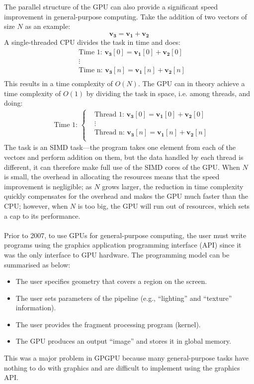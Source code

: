\documentclass[12pt, twocolumn]{report}
\begin{document}
The parallel structure of the GPU can also provide a significant speed improvement in general-purpose computing. Take the addition of two vectors of size $N$ as an example:
\begin{equation*}
    \boldsymbol{v_3} = \boldsymbol{v_1} + \boldsymbol{v_2}
\end{equation*}
A single-threaded CPU divides the task in time and does:
\begin{align*}
    & \text{Time 1: } \boldsymbol{v_3}[0] = \boldsymbol{v_1}[0] + \boldsymbol{v_2}[0] \\
    & \vdots \\
    & \text{Time n: } \boldsymbol{v_3}[n] = \boldsymbol{v_1}[n] + \boldsymbol{v_2}[n] \\
\end{align*}
This results in a time complexity of $O(N)$. The GPU can in theory achieve a time complexity of $O(1)$ by dividing the task in space, i.e. among threads, and doing:
\begin{align*}
    & \text{Time 1: }
\begin{cases}
    & \text{Thread 1: } \boldsymbol{v_3}[0] = \boldsymbol{v_1}[0] + \boldsymbol{v_2}[0] \\
    & \vdots \\
    & \text{Thread n: } \boldsymbol{v_3}[n] = \boldsymbol{v_1}[n] + \boldsymbol{v_2}[n] \\
\end{cases}
\end{align*}
The task is an SIMD task---the program takes one element from each of the vectors and perform addition on them, but the data handled by each thread is different, it can therefore make full use of the SIMD cores of the GPU. When $N$ is small, the overhead in allocating the resources means that the speed improvement is negligible; as $N$ grows larger, the reduction in time complexity quickly compensates for the overhead and makes the GPU much faster than the CPU; however, when $N$ is too big, the GPU will run out of resources, which sets a cap to its performance.

\paragraph{}
Prior to 2007, to use GPUs for general-purpose computing, the user must write programs using the graphics application programming interface (API) since it was the only interface to GPU hardware. The programming model can be summarised as below:
\begin{itemize}
    \item The user specifies geometry that covers a region on the screen.
    \item The user sets parameters of the pipeline (e.g., ``lighting'' and ``texture'' information).
    \item The user provides the fragment processing program (kernel).
    \item The GPU produces an output ``image'' and stores it in global memory.
\end{itemize}
This was a major problem in GPGPU because many general-purpose tasks have nothing to do with graphics and are difficult to implement using the graphics API. 
\end{document}
